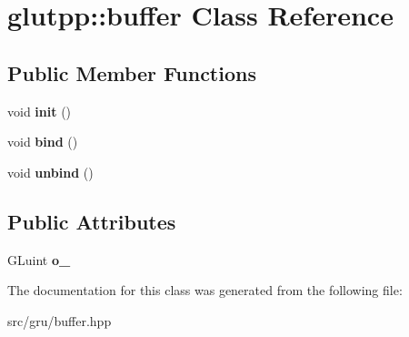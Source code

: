 \hypertarget{classglutpp_1_1buffer}{\section{glutpp\-:\-:buffer \-Class \-Reference}
\label{classglutpp_1_1buffer}
}
\subsection*{\-Public \-Member \-Functions}
\begin{DoxyCompactItemize}
\item 
\hypertarget{classglutpp_1_1buffer_a557629990348485f76e992293cfdb636}{void {\bfseries init} ()}\label{classglutpp_1_1buffer_a557629990348485f76e992293cfdb636}

\item 
\hypertarget{classglutpp_1_1buffer_a37d4b5aac0052a9724b94784205945e7}{void {\bfseries bind} ()}\label{classglutpp_1_1buffer_a37d4b5aac0052a9724b94784205945e7}

\item 
\hypertarget{classglutpp_1_1buffer_af93df84319c7d459b77c4c0c5e515119}{void {\bfseries unbind} ()}\label{classglutpp_1_1buffer_af93df84319c7d459b77c4c0c5e515119}

\end{DoxyCompactItemize}
\subsection*{\-Public \-Attributes}
\begin{DoxyCompactItemize}
\item 
\hypertarget{classglutpp_1_1buffer_a45bc4e78c108b155f79e81901b7faba1}{\-G\-Luint {\bfseries o\-\_\-}}\label{classglutpp_1_1buffer_a45bc4e78c108b155f79e81901b7faba1}

\end{DoxyCompactItemize}


\-The documentation for this class was generated from the following file\-:\begin{DoxyCompactItemize}
\item 
src/gru/buffer.\-hpp\end{DoxyCompactItemize}
